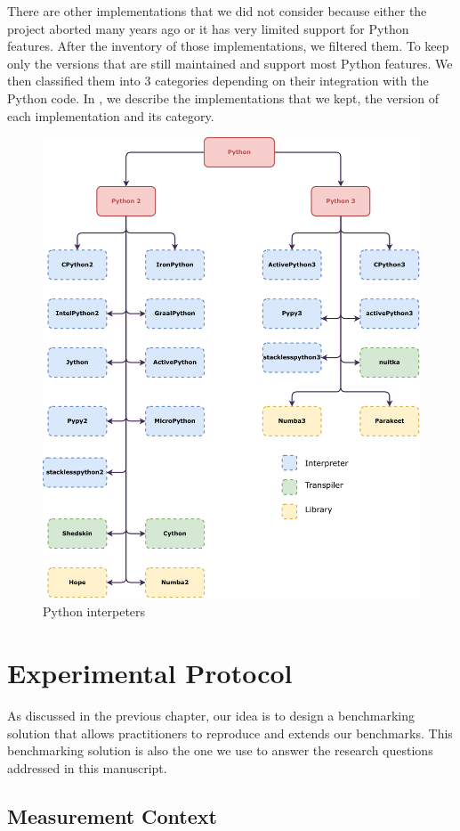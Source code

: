 There are other implementations that we did not consider because either the project aborted many years ago or it has very limited support for Python features.
After the inventory of those implementations, we filtered them.
To keep only the versions that are still maintained and support most Python features.
We then classified them into 3 categories depending on their integration with the Python code.
In , we describe the implementations that we kept, the version of each implementation and its category.

\begin{figure}
      \centering
      \includegraphics[width=.7\linewidth]{imgs/python-implementations-tree}
      \caption{Python interpeters}
      \label{fig:interpreters}
\end{figure}



\section{Experimental Protocol}
As discussed in the previous chapter, our idea is to design a benchmarking solution that allows practitioners to reproduce and extends our benchmarks.
This benchmarking solution is also the one we use to answer the research questions addressed in this manuscript.

\subsection{Measurement Context}
